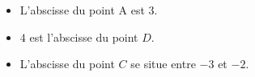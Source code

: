 \begin{itemize}
\item L'abscisse du point A est $3$.
\item $4$ est l'abscisse du point $D$.
\item L'abscisse du point $C$ se situe entre $-3$ et $-2$.
\end{itemize}


